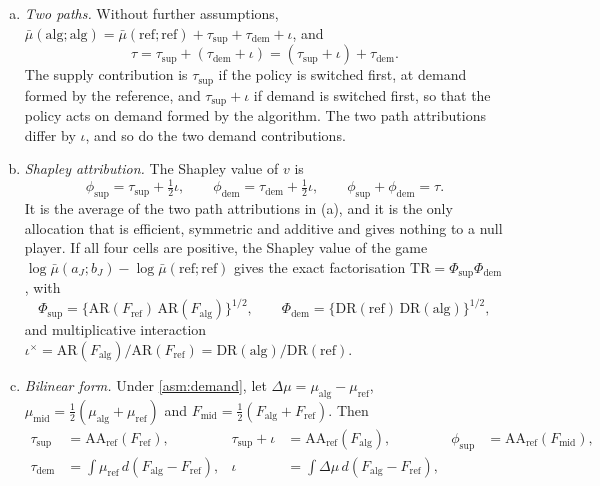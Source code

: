 \begin{theorem}\label{thm:decomp}
\leavevmode
\begin{enumerate}[(a)]
  \item \emph{Two paths.} Without further assumptions, $\bar\mu(\mathrm{alg};\mathrm{alg})=\bar\mu(\mathrm{ref};\mathrm{ref})+\tau_{\mathrm{sup}}+\tau_{\mathrm{dem}}+\iota$, and
  \[
    \tau=\tau_{\mathrm{sup}}+(\tau_{\mathrm{dem}}+\iota)=(\tau_{\mathrm{sup}}+\iota)+\tau_{\mathrm{dem}}.
  \]
  The supply contribution is $\tau_{\mathrm{sup}}$ if the policy is switched first, at demand formed by the reference, and $\tau_{\mathrm{sup}}+\iota$ if demand is switched first, so that the policy acts on demand formed by the algorithm. The two path attributions differ by $\iota$, and so do the two demand contributions.
  \item \emph{Shapley attribution.} The Shapley value of $v$ is
  \[
    \phi_{\mathrm{sup}}=\tau_{\mathrm{sup}}+\tfrac12\iota,\qquad \phi_{\mathrm{dem}}=\tau_{\mathrm{dem}}+\tfrac12\iota,\qquad \phi_{\mathrm{sup}}+\phi_{\mathrm{dem}}=\tau .
  \]
  It is the average of the two path attributions in (a), and it is the only allocation that is efficient, symmetric and additive and gives nothing to a null player. If all four cells are positive, the Shapley value of the game $\log\bar\mu(a_J;b_J)-\log\bar\mu(\mathrm{ref};\mathrm{ref})$ gives the exact factorisation $\mathrm{TR}=\Phi_{\mathrm{sup}}\Phi_{\mathrm{dem}}$, with
  \[
    \Phi_{\mathrm{sup}}=\{\mathrm{AR}(F_{\mathrm{ref}})\,\mathrm{AR}(F_{\mathrm{alg}})\}^{1/2},\qquad
    \Phi_{\mathrm{dem}}=\{\mathrm{DR}(\mathrm{ref})\,\mathrm{DR}(\mathrm{alg})\}^{1/2},
  \]
  and multiplicative interaction $\iota^{\times}=\mathrm{AR}(F_{\mathrm{alg}})/\mathrm{AR}(F_{\mathrm{ref}})=\mathrm{DR}(\mathrm{alg})/\mathrm{DR}(\mathrm{ref})$.
  \item \emph{Bilinear form.} Under \cref{asm:demand}, let $\Delta\mu=\mu_{\mathrm{alg}}-\mu_{\mathrm{ref}}$, $\mu_{\mathrm{mid}}=\frac12(\mu_{\mathrm{alg}}+\mu_{\mathrm{ref}})$ and $F_{\mathrm{mid}}=\frac12(F_{\mathrm{alg}}+F_{\mathrm{ref}})$. Then
  \[
  \begin{aligned}
    \tau_{\mathrm{sup}}&=\mathrm{AA}_{\mathrm{ref}}(F_{\mathrm{ref}}), &
    \tau_{\mathrm{sup}}+\iota&=\mathrm{AA}_{\mathrm{ref}}(F_{\mathrm{alg}}), &
    \phi_{\mathrm{sup}}&=\mathrm{AA}_{\mathrm{ref}}(F_{\mathrm{mid}}),\\
    \tau_{\mathrm{dem}}&={\textstyle\int}\mu_{\mathrm{ref}}\,d(F_{\mathrm{alg}}-F_{\mathrm{ref}}), &
    \iota&={\textstyle\int}\Delta\mu\,d(F_{\mathrm{alg}}-F_{\mathrm{ref}}), &

\end{aligned}\]
\end{enumerate}
\end{theorem}
